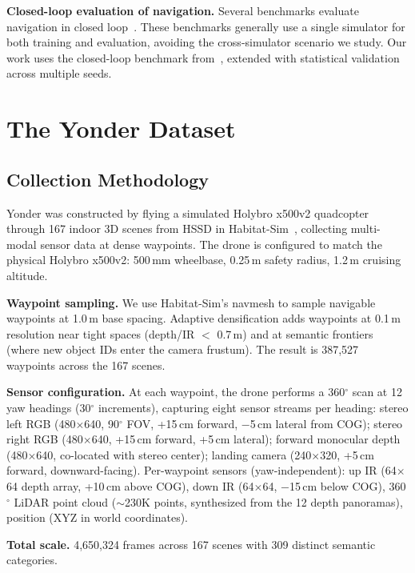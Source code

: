 \documentclass[conference]{IEEEtran}
\begin{document}
\textbf{Closed-loop evaluation of navigation.} Several benchmarks evaluate navigation in closed loop~\cite{anderson2018vision,savva2019habitat}. These benchmarks generally use a single simulator for both training and evaluation, avoiding the cross-simulator scenario we study. Our work uses the closed-loop benchmark from~\cite{anon2026closing}, extended with statistical validation across multiple seeds.

\section{The Yonder Dataset}

\subsection{Collection Methodology}

Yonder was constructed by flying a simulated Holybro x500v2 quadcopter through 167 indoor 3D scenes from HSSD in Habitat-Sim~\cite{savva2019habitat}, collecting multi-modal sensor data at dense waypoints. The drone is configured to match the physical Holybro x500v2: 500\,mm wheelbase, 0.25\,m safety radius, 1.2\,m cruising altitude.

\textbf{Waypoint sampling.} We use Habitat-Sim's navmesh to sample navigable waypoints at 1.0\,m base spacing. Adaptive densification adds waypoints at 0.1\,m resolution near tight spaces (depth/IR $<$ 0.7\,m) and at semantic frontiers (where new object IDs enter the camera frustum). The result is 387,527 waypoints across the 167 scenes.

\textbf{Sensor configuration.} At each waypoint, the drone performs a 360$^{\circ}$ scan at 12 yaw headings (30$^{\circ}$ increments), capturing eight sensor streams per heading: stereo left RGB (480$\times$640, 90$^{\circ}$ FOV, +15\,cm forward, $-$5\,cm lateral from COG); stereo right RGB (480$\times$640, +15\,cm forward, +5\,cm lateral); forward monocular depth (480$\times$640, co-located with stereo center); landing camera (240$\times$320, +5\,cm forward, downward-facing). Per-waypoint sensors (yaw-independent): up IR (64$\times$64 depth array, +10\,cm above COG), down IR (64$\times$64, $-$15\,cm below COG), 360$^{\circ}$ LiDAR point cloud ($\sim$230K points, synthesized from the 12 depth panoramas), position (XYZ in world coordinates).

\textbf{Total scale.} 4,650,324 frames across 167 scenes with 309 distinct semantic categories.
\end{document}
